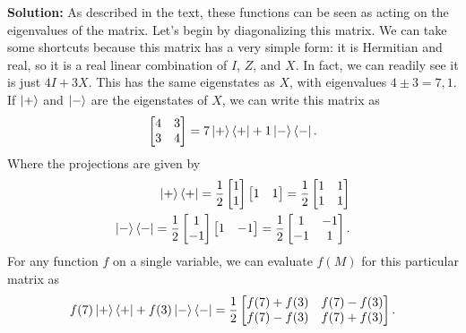\documentclass{book}
\begin{document}
    \textbf{Solution:} As described in the text, these functions can be seen as acting on the eigenvalues of the matrix. Let's begin by diagonalizing this matrix. We can take some shortcuts because this matrix has a very simple form: it is Hermitian and real, so it is a real linear combination of $I$, $Z$, and $X$. In fact, we can readily see it is just $4 I + 3 X$. This has the same eigenstates as $X$, with eigenvalues $4 \pm 3 = 7, 1$. If $\ket{+}$ and $\ket{-}$ are the eigenstates of $X$, we can write this matrix as 
    \begin{align}
        \begin{bmatrix}
            4 & 3 \\
            3 & 4
        \end{bmatrix} = 7 \ket{+}\bra{+} + 1 \ket{-}\bra{-}.
    \end{align}
    Where the projections are given by
    \begin{align}
    \begin{aligned}
        \ket{+}\bra{+} = \frac{1}{2} \begin{bmatrix}
            1 \\
            1
        \end{bmatrix} \begin{bmatrix}
            1 & 1
        \end{bmatrix} = \frac{1}{2} \begin{bmatrix}
            1 & 1 \\
            1 & 1
        \end{bmatrix} \\
        \ket{-}\bra{-} = \frac{1}{2} \begin{bmatrix}
            1 \\
            -1
        \end{bmatrix} \begin{bmatrix}
            1 & -1
        \end{bmatrix} = \frac{1}{2} \begin{bmatrix}
            1 & -1 \\
            -1 & 1
        \end{bmatrix}.
    \end{aligned}
    \end{align}
    For any function $f$ on a single variable, we can evaluate $f(M)$ for this particular matrix as 
    \begin{align}
        f(7) \ket{+}\bra{+} + f(3) \ket{-}\bra{-} = \frac{1}{2} \begin{bmatrix}
            f(7) + f(3) & f(7)-f(3) \\
            f(7)-f(3) & f(7) + f(3)
        \end{bmatrix}.
    \end{align}
\end{document}
